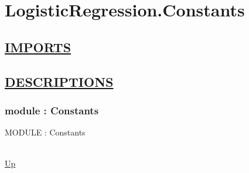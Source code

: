 \chapter*{LogisticRegression.Constants}
\hypertarget{LogisticRegression.Constants}{}

\section*{\underline{IMPORTS}}

\section*{\underline{DESCRIPTIONS}}
\subsection*{module : Constants}
\hypertarget{ecldoc:LogisticRegression.Constants}{MODULE : Constants} \\
\hyperlink{ecldoc:}{Up} \\
\par

